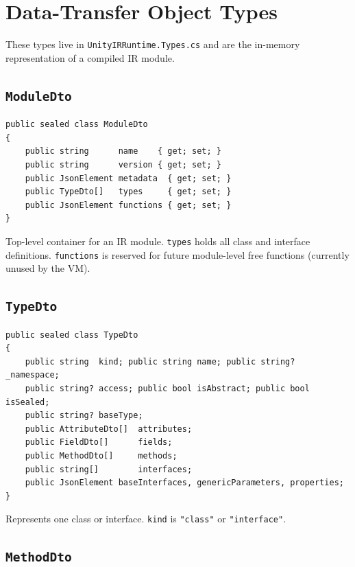 \documentclass[11pt,a4paper]{article}
\newcommand{\code}[1]{\texttt{\small #1}}
\begin{document}
\section{Data-Transfer Object Types}

These types live in \texttt{UnityIRRuntime.Types.cs} and are the in-memory
representation of a compiled IR module.

\subsection{\texttt{ModuleDto}}

\begin{lstlisting}[style=cs]
public sealed class ModuleDto
{
    public string      name    { get; set; }
    public string      version { get; set; }
    public JsonElement metadata  { get; set; }
    public TypeDto[]   types     { get; set; }
    public JsonElement functions { get; set; }
}
\end{lstlisting}

Top-level container for an IR module. \code{types} holds all class and interface
definitions. \code{functions} is reserved for future module-level free functions
(currently unused by the VM).

\subsection{\texttt{TypeDto}}

\begin{lstlisting}[style=cs]
public sealed class TypeDto
{
    public string  kind; public string name; public string? _namespace;
    public string? access; public bool isAbstract; public bool isSealed;
    public string? baseType;
    public AttributeDto[]  attributes;
    public FieldDto[]      fields;
    public MethodDto[]     methods;
    public string[]        interfaces;
    public JsonElement baseInterfaces, genericParameters, properties;
}
\end{lstlisting}

Represents one class or interface. \code{kind} is \texttt{"class"} or
\texttt{"interface"}.

\subsection{\texttt{MethodDto}}
\end{document}
